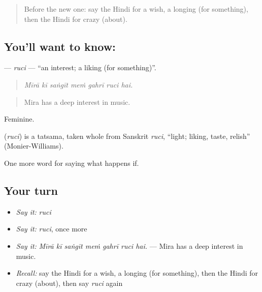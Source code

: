 \label{lesson:HI-C558-ruci}



\begin{quote}
Before the new one: say the Hindi for a wish, a longing (for something), then the Hindi for crazy (about).
\end{quote}

\subsection*{You'll want to know: }
\textbf{} — \emph{ruci} — \textquotedblleft{}an interest; a liking (for something)\textquotedblright{}.

\begin{quote}
      
\end{quote}

\begin{quote}
\emph{Mīrā kī saṅgīt meṁ gahrī ruci hai.}
\end{quote}

\begin{quote}
Mira has a deep interest in music.
\end{quote}

Feminine.

\begin{cousinweb}
\textbf{} (\emph{ruci}) is a tatsama, taken whole from Sanskrit \emph{ruci}, \textquotedblleft{}light; liking, taste, relish\textquotedblright{} (Monier-Williams).
\end{cousinweb}

\begin{grammarlens}[title={What you've built}]
One more word for saying what happens if.
\end{grammarlens}

\subsection*{Your turn}
\begin{itemize}
\raggedright
  \item \emph{Say it:} \emph{ruci}
  \item \emph{Say it:} \emph{ruci}, once more
  \item \emph{Say it:} \emph{Mīrā kī saṅgīt meṁ gahrī ruci hai.} — Mira has a deep interest in music.
  \item \emph{Recall:} say the Hindi for a wish, a longing (for something), then the Hindi for crazy (about), then say \emph{ruci} again
\end{itemize}

